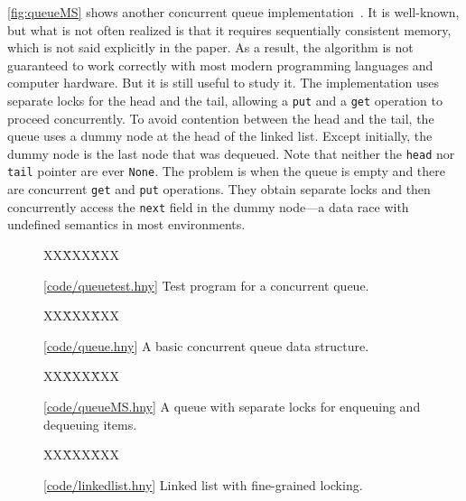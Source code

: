\documentclass{report}
\newcommand{\harmonysource}[1]{
\begin{tabbing}
XX\=XXX\=XXX\kill
    
\end{tabbing}
}
\newcommand{\harmonylink}[1]{%
[\href{https://harmony.cs.cornell.edu/#1}{\underline{#1}}]%
}
\newenvironment{code}{
\tcolorbox
}{
\endtcolorbox
}
\begin{document}
\autoref{fig:queueMS} shows another
concurrent queue implementation~\cite{MS96}.
It is well-known, but what is not often realized is that
it requires sequentially consistent memory, which is not
said explicitly in the paper.
As a result, the algorithm is not guaranteed to work
correctly with most modern programming languages and
computer hardware.  But it is still useful to study it.
The implementation uses separate
locks for the head and the tail,
allowing a \texttt{put} and a \texttt{get} operation
to proceed concurrently.  To avoid contention between the head and the tail,
the queue uses a dummy node at the head of the linked list.
Except initially, the dummy node is the last node that was dequeued.
Note that neither the \texttt{head} nor \texttt{tail} pointer are
ever \texttt{None}.
The problem is when the queue is empty and there are concurrent
\texttt{get} and \texttt{put} operations.
They obtain separate locks and then concurrently access the
\texttt{next} field in the dummy node---a data race with
undefined semantics in most environments.

\begin{figure}
\begin{code}
\harmonysource{queuetest}
\end{code}
\caption{\harmonylink{code/queuetest.hny} Test program for a concurrent queue.}
\label{fig:queuetest}
\end{figure}

\begin{figure}
\begin{code}
\harmonysource{queue}
\end{code}
\caption{\harmonylink{code/queue.hny}A basic concurrent queue data structure.}
\label{fig:queue}
\end{figure}

\begin{figure}
\begin{code}
\harmonysource{queueMS}
\end{code}
\caption{\harmonylink{code/queueMS.hny} A queue with separate locks for enqueuing and dequeuing items.}
\label{fig:queueMS}
\end{figure}

\begin{figure}
\begin{code}
\harmonysource{linkedlist}
\end{code}
\caption{\harmonylink{code/linkedlist.hny} Linked list with fine-grained locking.}
\label{fig:linkedlist}
\end{figure}
\end{document}
